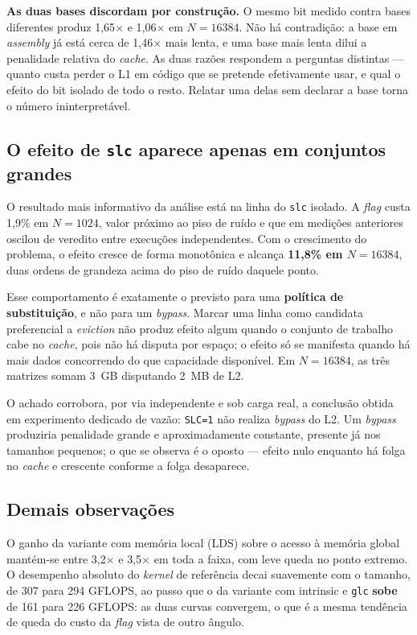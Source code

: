 \documentclass[12pt]{article}
\begin{document}
\textbf{As duas bases discordam por construção.} O mesmo bit medido contra bases
diferentes produz 1,65$\times$ e 1,06$\times$ em $N=16384$. Não há contradição:
a base em \textit{assembly} já está cerca de 1,46$\times$ mais lenta, e uma base
mais lenta dilui a penalidade relativa do \textit{cache}. As duas razões
respondem a perguntas distintas --- quanto custa perder o L1 em código que se
pretende efetivamente usar, e qual o efeito do bit isolado de todo o resto.
Relatar uma delas sem declarar a base torna o número ininterpretável.

\subsection{O efeito de \texttt{slc} aparece apenas em conjuntos grandes}

O resultado mais informativo da análise está na linha do \texttt{slc} isolado.
A \textit{flag} custa 1,9\% em $N=1024$, valor próximo ao piso de ruído e que em
medições anteriores oscilou de veredito entre execuções independentes. Com o
crescimento do problema, o efeito cresce de forma monotônica e alcança
\textbf{11,8\% em $N=16384$}, duas ordens de grandeza acima do piso de ruído
daquele ponto.

Esse comportamento é exatamente o previsto para uma \textbf{política de
substituição}, e não para um \textit{bypass}. Marcar uma linha como candidata
preferencial a \textit{eviction} não produz efeito algum quando o conjunto de
trabalho cabe no \textit{cache}, pois não há disputa por espaço; o efeito só se
manifesta quando há mais dados concorrendo do que capacidade disponível. Em
$N=16384$, as três matrizes somam 3~GB disputando 2~MB de L2.

O achado corrobora, por via independente e sob carga real, a conclusão obtida em
experimento dedicado de vazão: \texttt{SLC=1} não realiza \textit{bypass} do L2.
Um \textit{bypass} produziria penalidade grande e aproximadamente constante,
presente já nos tamanhos pequenos; o que se observa é o oposto --- efeito nulo
enquanto há folga no \textit{cache} e crescente conforme a folga desaparece.

\subsection{Demais observações}

O ganho da variante com memória local (LDS) sobre o acesso à memória global
mantém-se entre 3,2$\times$ e 3,5$\times$ em toda a faixa, com leve queda no
ponto extremo. O desempenho absoluto do \textit{kernel} de referência decai
suavemente com o tamanho, de 307 para 294 GFLOPS, ao passo que o da variante com
intrinsic e \texttt{glc} \textbf{sobe} de 161 para 226 GFLOPS: as duas curvas
convergem, o que é a mesma tendência de queda do custo da \textit{flag} vista de
outro ângulo.
\end{document}

